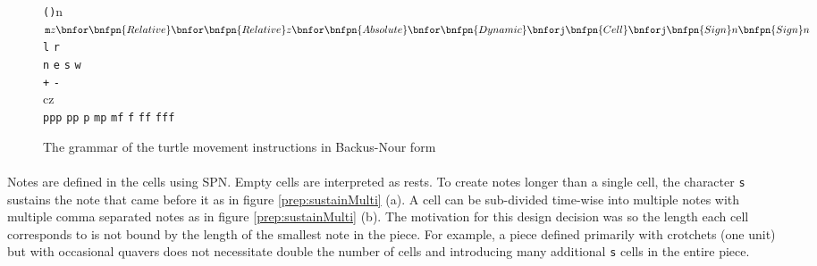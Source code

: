 \newenvironment{bnfsplit}[1][0.7\textwidth]
 {\minipage[t]{#1}$}
 {$\endminipage}

\begin{figure}[ht]
\renewcommand{\models}{::=}
\begin{bnf*}
  {
   }\\
    {
    \bnfor {}
     }\\
   {
   \texttt{(}\texttt{)}n
   \bnfor {}
    }\\
    {
    \begin{bnfsplit}
    \texttt{m}z
    \bnfor \bnfpn{Relative}
    \bnfor \bnfpn{Relative}z
    \bnfor \bnfpn{Absolute}
    \bnfor \bnfpn{Dynamic}
    \\ \bnfor \texttt{j}\bnfpn{Cell}
    \bnfor \texttt{j}\bnfpn{Sign}n\bnfpn{Sign}n
    \end{bnfsplit}
     }\\
     {
     \texttt{l}
     \bnfor \texttt{r}
      }\\
    {
    \texttt{n}
    \bnfor \texttt{e}
    \bnfor \texttt{s}
    \bnfor \texttt{w}
     }\\
   {
   \texttt{+}
   \bnfor \texttt{-}
    }\\
    {
    cz
     }\\
   {
   \texttt{ppp}
   \bnfor \texttt{pp}
   \bnfor \texttt{p}
   \bnfor \texttt{mp}
   \bnfor \texttt{mf}
   \bnfor \texttt{f}
   \bnfor \texttt{ff}
   \bnfor \texttt{fff}
    }\\
\end{bnf*}
\vspace{-35pt}
\caption{The grammar of the turtle movement instructions in Backus-Nour form}
\label{fig:grammar}
\end{figure}

\paragraph{} Notes are defined in the cells using SPN. Empty cells are interpreted as rests. To create notes longer than a single cell, the character \texttt{s} sustains the note that came before it as in figure \ref{prep:sustainMulti} (a). A cell can be sub-divided time-wise into multiple notes with multiple comma separated notes as in figure \ref{prep:sustainMulti} (b). The motivation for this design decision was so the length each cell corresponds to is not bound by the length of the smallest note in the piece. For example, a piece defined primarily with crotchets (one unit) but with occasional quavers does not necessitate double the number of cells and introducing many additional \texttt{s} cells in the entire piece.


